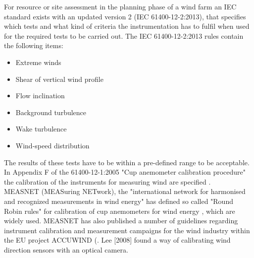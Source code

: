 
\iffalse
For resource or site assessment in the planning phase of a wind farm an IEC standard exists \citep{iec17025-2005E} with an updated version 2 (IEC 61400-12-2:2013), that specifies which tests and what kind of criteria the instrumentation has to fulfil when used for the required tests to be carried out. The IEC 61400-12-2:2013 rules contain the following items:
\begin{itemize}
    \item Extreme winds
    \item Shear of vertical wind profile
    \item Flow inclination
    \item Background turbulence
    \item Wake turbulence
    \item Wind-speed distribution
\end{itemize}

The results of these tests have to be within a pre-defined range to be acceptable. In Appendix F of the 61400-12-1:2005 "Cup anemometer calibration procedure" the calibration of the instruments for measuring wind are specified \cite{iec61400-12-1-2005}.\\


MEASNET (MEASuring NETwork), the "international network for harmonised and recognized measurements in wind energy" has defined so called "Round Robin rules" for calibration of cup anemometers for wind energy \cite{measnet2009}, which are widely used. MEASNET has also  published a number of guidelines regarding instrument calibration and measurement campaigns for the wind industry within the EU project ACCUWIND (\cite{Dahlberg2006,Pedersen2006, Eecen2006}. Lee [2008] found a way of calibrating wind direction sensors with an optical camera.

